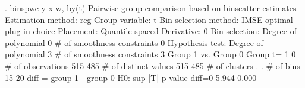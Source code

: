 . binspwc y x w, by(t)
{\smallskip}
Pairwise group comparison based on binscatter estimates
Estimation method: reg
Group variable: t
Bin selection method: IMSE-optimal plug-in choice
Placement: Quantile-spaced
Derivative: 0
Bin selection:                {\VBAR} 
         Degree of polynomial {\VBAR}       0
  \# of smoothness constraints {\VBAR}       0
Hypothesis test:              {\VBAR} 
         Degree of polynomial {\VBAR}       3
  \# of smoothness constraints {\VBAR}       3
{\smallskip}
Group 1 vs. Group 0
Group t=                      {\VBAR}      1   {\VBAR}     0
\# of observations             {\VBAR}     515  {\VBAR}     485
\# of distinct values          {\VBAR}     515  {\VBAR}     485
\# of clusters                 {\VBAR}       .  {\VBAR}       .
\# of bins                     {\VBAR}      15  {\VBAR}      20
{\smallskip}
diff = group 1 - group 0
H0:                {\VBAR} sup |T|           p value
diff=0             {\VBAR}   5.944             0.000
{\smallskip}
